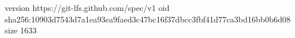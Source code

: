 version https://git-lfs.github.com/spec/v1
oid sha256:10903d7543d7a1ea93ea9faed3c47bc16f37dbcc3fbf41d77ca3bd16bb0b6d08
size 1633
